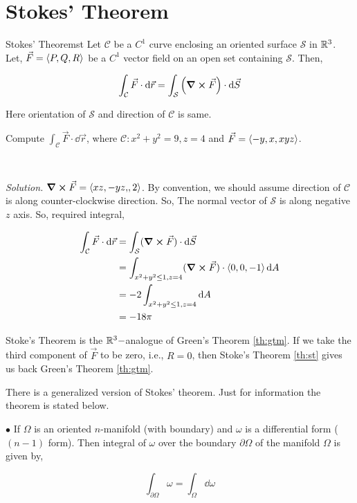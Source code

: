 \documentclass[../Analysis-3.tex]{subfiles}
\begin{document}
\section{Stokes' Theorem}
\begin{Thm}{Stokes' Theorem}{st}
  Let $\mathcal{C}$ be a $C^1$ curve enclosing an oriented surface $\mathcal{S}$ in $\mathbb{R}^3$. Let,  $\vec{F} = \left\langle {P,Q}, {R} \right\rangle$ be a $C^1$ vector field on an open set containing $\mathcal{S}$. Then,

  \small \[\int_{\mathcal{C}} \vec{F} \cdot \dd{\vec{r}} = \int_{\mathcal{S}} \left( \curl \vec{F} \right) \cdot\dd{\vec{S}}  \]

  Here orientation of $\mathcal{S}$ and direction of $\mathcal{C}$ is same.
\end{Thm}

\begin{Eg}{}{}
  Compute $\displaystyle\int_{\mathcal{C}} \vec{F} \cdot \dd{\vec{r}}$, where $\mathcal{C} : x^2 +y^2 = 9, z =4$ and $\vec{F} = \left\langle {-y,x}, {xyz} \right\rangle$.

  \

  \textit{Solution.} $\curl \vec{F} = \left\langle {xz,-yz,}, {2} \right\rangle$. By convention, we should assume direction of $\mathcal{C}$ is along counter-clockwise direction. So,  The normal vector of $\mathcal{S}$ is along negative $z$ axis. So, required integral,

  \begin{align*}
    \int_{\mathcal{C}} \vec{F} \cdot \dd{\vec{r}}
     & = \int_{\mathcal{S}} (\curl \vec{F}) \cdot \dd{\vec{S}}                   \\
     & = \int_{x^2+y^2 \leq 1, z =4 } (\curl \vec{F}) \cdot \left\langle {0,0}, {-1} \right\rangle \dd{A} \\
     & = -2 \int_{x^2+y^2 \leq 1, z =4} \dd{A}                                   \\
     & = -18\pi
  \end{align*}

\end{Eg}


Stoke's Theorem is the $\mathbb{R}^3-$analogue of Green's Theorem \ref{th:gtm}. If we take the third component of $\vec{F}$ to be zero, i.e., $R = 0$, then Stoke's Theorem \ref{th:st} gives us back Green's Theorem \ref{th:gtm}.

\begin{tcolorbox}
  There is a generalized version of Stokes' theorem. Just for information the theorem is stated below.

  $\bullet$ If $\Omega$ is an oriented $n$-manifold (with boundary) and $\omega$ is a differential form ($(n-1)$ form). Then integral of $\omega$ over the boundary $\partial \Omega$ of the manifold $\Omega$ is given by,

  \[\int_{\partial \Omega} \omega = \int_{\Omega} \dd \omega\]

\end{tcolorbox}
\end{document}
